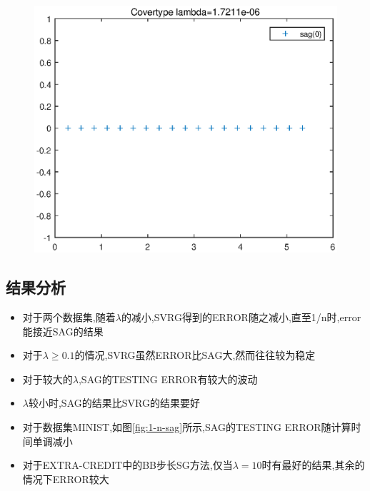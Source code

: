 \documentclass[UTF8]{ctexart}
\begin{document}
\begin{figure}[htbp]
\centering\includegraphics[width=5in]{2-n-sag.eps}
\caption{}\label{fig:2-n-sag}
\end{figure}



\subsection{结果分析}
\begin{itemize}
  \item 对于两个数据集,随着$\lambda$的减小,SVRG得到的ERROR随之减小,直至1/n时,error能接近SAG的结果
  \item 对于$\lambda\geq 0.1$的情况,SVRG虽然ERROR比SAG大,然而往往较为稳定
  \item 对于较大的$\lambda$,SAG的TESTING ERROR有较大的波动
  \item $\lambda$较小时,SAG的结果比SVRG的结果要好
  \item 对于数据集MINIST,如图\ref{fig:1-n-sag}所示,SAG的TESTING ERROR随计算时间单调减小
  \item 对于EXTRA-CREDIT中的BB步长SG方法,仅当$\lambda=10$时有最好的结果,其余的情况下ERROR较大
\end{itemize}
  
\end{document}
